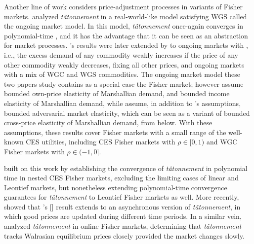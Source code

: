 Another line of work considers price-adjustment processes in variants of Fisher markets.
\citet{cole2008fast} analyzed \emph{t\^atonnement\/} in a real-world-like model satisfying WGS called the ongoing market model.
In this model, \emph{t\^atonnement\/} once-again converges in polynomial-time \cite{cole2008fast, cole2010discrete}, and it has the advantage that it can be seen as an abstraction for market processes.
\citeauthor{cole2008fast}'s results were later extended by \citet{cheung2012tatonnement} to ongoing markets with , i.e., the excess demand of any commodity weakly increases if the price of any other commodity weakly decreases, fixing all other prices, and ongoing markets with a mix of WGC and WGS commodities.
The ongoing market model these two papers study contains as a special case the Fisher market; however \citet{cole2008fast} assume bounded own-price elasticity of Marshallian demand, and bounded income elasticity of Marshallian demand, while \citet{cheung2012tatonnement} assume, in addition to \citeauthor{cole2008fast}'s assumptions, bounded adversarial market elasticity, which can be seen as a variant of bounded cross-price elasticity of Marshallian demand, from below.
With these assumptions, these results cover Fisher markets with a small range of the well-known CES utilities, including CES Fisher markets with $\rho \in [0, 1)$ and WGC Fisher markets with $\rho \in (- 1, 0]$.%

\citet{fisher-tatonnement} built on this work by establishing the convergence of \emph{t\^atonnement\/} in polynomial time in nested CES Fisher markets, excluding the limiting cases of linear and Leontief markets, but nonetheless extending polynomial-time convergence guarantees for \emph{t\^atonnement\/} to Leontief Fisher markets as well.
More recently, \citet{cheung2018amortized} showed that \citeauthor{fisher-tatonnement}'s [\citeyear{fisher-tatonnement}] result extends to an asynchronous version of \emph{t\^atonnement}, in which good prices are updated during different time periods. 
In a similar vein, \citet{cheung2019tracing} analyzed \emph{t\^atonnement\/} in online Fisher markets, determining that \emph{t\^atonnement\/} tracks Walrasian equilibrium prices closely provided the market changes slowly.

